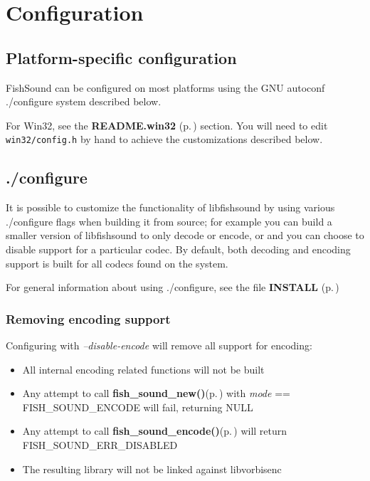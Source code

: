 \section{Configuration}
\label{group__configuration}
\subsection{Platform-specific configuration}\label{platforms}
Fish\-Sound can be configured on most platforms using the GNU autoconf ./configure system described below.

For Win32, see the {\bf README.win32 }{\rm (p.\,\pageref{group__win32})} section. You will need to edit {\tt win32/config.h} by hand to achieve the customizations described below.\subsection{./configure}\label{configure}
It is possible to customize the functionality of libfishsound by using various ./configure flags when building it from source; for example you can build a smaller version of libfishsound to only decode or encode, or and you can choose to disable support for a particular codec. By default, both decoding and encoding support is built for all codecs found on the system.

For general information about using ./configure, see the file {\bf INSTALL }{\rm (p.\,\pageref{group__install})}\subsubsection{Removing encoding support}\label{no_encode}
Configuring with {\em --disable-encode\/} will remove all support for encoding:\begin{itemize}
\item All internal encoding related functions will not be built\item Any attempt to call {\bf fish\_\-sound\_\-new()}{\rm (p.\,\pageref{fishsound_8h_a4})} with {\em mode\/} == FISH\_\-SOUND\_\-ENCODE will fail, returning NULL\item Any attempt to call {\bf fish\_\-sound\_\-encode()}{\rm (p.\,\pageref{fishsound_8h_a8})} will return FISH\_\-SOUND\_\-ERR\_\-DISABLED\item The resulting library will not be linked against libvorbisenc\end{itemize}
